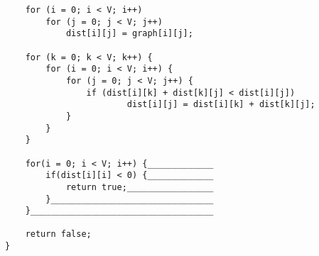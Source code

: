 \begin{parts}
\begin{lstlisting}
    for (i = 0; i < V; i++) 
        for (j = 0; j < V; j++) 
            dist[i][j] = graph[i][j]; 
   
    for (k = 0; k < V; k++) { 
        for (i = 0; i < V; i++) { 
            for (j = 0; j < V; j++) { 
                if (dist[i][k] + dist[k][j] < dist[i][j]) 
                        dist[i][j] = dist[i][k] + dist[k][j]; 
            } 
        } 
    } 
    
    for(i = 0; i < V; i++) {_____________
        if(dist[i][i] < 0) {_____________
            return true;_________________
        }________________________________
    }____________________________________
            
    return false;  
} 

\end{lstlisting}

\end{parts}
\newpage